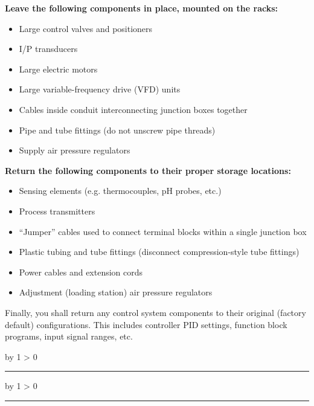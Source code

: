 \documentclass[12pt,a4paper]{article}
\def\svar{
           \advance\answnum by 1
           \ifnum \answnum > 0
                \hrule
                \vskip 3pt
                \leftline{Svar \the\answnum}
                \vskip 3pt \fi}
\def\notes{
           \advance\explnum by 1
           \ifnum \explnum > 0
                \hrule
                \vskip 3pt
                \leftline{Notes \the\explnum}
                \vskip 3pt \fi}
\begin{document}
\begin{itemize}
\vskip 10pt

\indent
{\bf Leave the following components in place, mounted on the racks:}

\begin{itemize}
\item{} Large control valves and positioners
\item{} I/P transducers
\item{} Large electric motors
\item{} Large variable-frequency drive (VFD) units
\item{} Cables inside conduit interconnecting junction boxes together
\item{} Pipe and tube fittings (do not unscrew pipe threads)
\item{} Supply air pressure regulators
\end{itemize}

\vskip 10pt

\indent
{\bf Return the following components to their proper storage locations:}

\begin{itemize}
\item{} Sensing elements (e.g. thermocouples, pH probes, etc.)
\item{} Process transmitters
\item{} ``Jumper'' cables used to connect terminal blocks within a single junction box
\item{} Plastic tubing and tube fittings (disconnect compression-style tube fittings)
\item{} Power cables and extension cords
\item{} Adjustment (loading station) air pressure regulators
\end{itemize}

\vskip 10pt

Finally, you shall return any control system components to their original (factory default) configurations.  This includes controller PID settings, function block programs, input signal ranges, etc.



\vskip 10pt \filbreak 





\svar{} 


\vskip 10pt \filbreak 





\notes{} 


\end{itemize}
\end{document}
